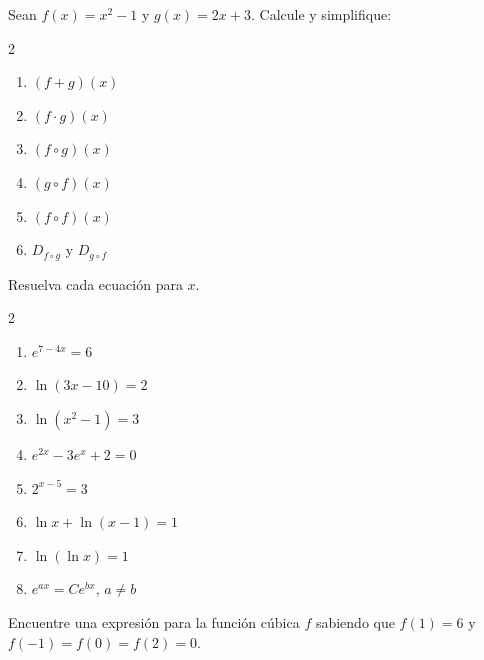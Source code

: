 \begin{prob}
Sean $f(x) = x^2-1$ y $g(x) = 2x+3$. Calcule y simplifique:
\begin{multicols}{2}
\begin{enumerate}
  \item $(f+g)(x)$
  \item $(f\cdot g)(x)$
  \item $(f\circ g)(x)$
  \item $(g\circ f)(x)$
  \item $(f\circ f)(x)$
  \item $D_{f\circ g}$ y $D_{g\circ f}$
\end{enumerate}
\end{multicols}
\end{prob}

\begin{prob}
Resuelva cada ecuación para $x$.
\begin{multicols}{2}
\begin{enumerate}
  \item $e^{7-4x} = 6$
  \item $\ln(3x-10) = 2$
  \item $\ln(x^2-1) = 3$
  \item $e^{2x} - 3e^x + 2 = 0$
  \item $2^{x-5} = 3$
  \item $\ln x + \ln(x-1) = 1$
  \item $\ln(\ln x) = 1$
  \item $e^{ax} = Ce^{bx}$, $a \neq b$
\end{enumerate}
\end{multicols}
\end{prob}

\begin{prob}
Encuentre una expresión para la función cúbica $f$ sabiendo que $f(1) = 6$ y $f(-1) = f(0) = f(2) = 0$.
\end{prob}

